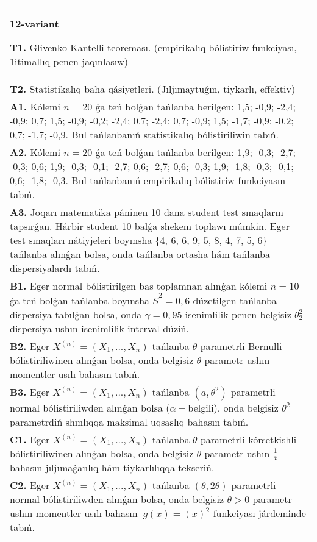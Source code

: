 \documentclass{article}
\begin{document}
\begin{tabular}{m{17cm}}
\textbf{12-variant}
\newline

\textbf{T1.} 
Glivenko-Kantelli teoreması. (empirikalıq bólistiriw funkciyası, 1itimallıq penen jaqınlasıw)
 \\
\textbf{T2.} 
Statistikalıq baha qásiyetleri. (Jıljımaytuǵın, tiykarlı, effektiv)
 \\
\textbf{A1.} 
Kólemi \(n = 20\) ǵa teń bolǵan tańlanba berilgen: 1,5; -0,9; -2,4; -0,9; 0,7; 1,5; -0,9; -0,2; -2,4; 0,7; -2,4; 0,7; -0,9; 1,5; -1,7; -0,9; -0,2; 0,7; -1,7; -0,9. Bul tańlanbanıń statistikalıq bólistiriliwin tabıń.
 \\
\textbf{A2.} 
Kólemi \(n = 20\) ǵa teń bolǵan tańlanba berilgen: 1,9; -0,3; -2,7; -0,3; 0,6; 1,9; -0,3; -0,1; -2,7; 0,6; -2,7; 0,6; -0,3; 1,9; -1,8; -0,3; -0,1; 0,6; -1,8; -0,3. Bul tańlanbanıń empirikalıq bólistiriw funkciyasın tabıń.
 \\
\textbf{A3.} 
Joqarı matematika páninen 10 dana student test sınaqların tapsırǵan. Hárbir student 10 balǵa shekem toplawı múmkin. Eger test sınaqları nátiyjeleri boyınsha \{4, 6, 6, 9, 5, 8, 4, 7, 5, 6\} tańlanba alınǵan bolsa, onda tańlanba ortasha hám tańlanba dispersiyalardı tabıń.
 \\
\textbf{B1.} 
Eger normal bólistirilgen bas toplamnan alınǵan kólemi \(n = 10\) ǵa teń bolǵan tańlanba boyınsha \({\overline{S}}^{2} = 0,6\) dúzetilgen tańlanba dispersiya tabılǵan bolsa, onda \(\gamma = 0,95\) isenimlilik penen belgisiz \(\theta_{2}^{2}\) dispersiya ushın isenimlilik interval dúziń.
 \\
\textbf{B2.} 
Eger \(X^{(n)} = \left( X_{1},...,X_{n} \right)\) tańlanba \(\theta\) parametrli Bernulli bólistiriliwinen alınǵan bolsa, onda belgisiz \(\theta\) parametr ushın momentler usılı bahasın tabıń.
 \\
\textbf{B3.} 
Eger \(X^{(n)} = \left( X_{1},...,X_{n} \right)\) tańlanba \(\left( a,\theta^{2} \right)\) parametrli normal bólistiriliwden alınǵan bolsa (\(\alpha -\)belgili), onda belgisiz \(\theta^{2}\) parametrdiń shınlıqqa maksimal uqsaslıq bahasın tabıń.
 \\
\textbf{C1.} 
Eger \(X^{(n)} = \left( X_{1},...,X_{n} \right)\) tańlanba \(\theta\) parametrli kórsetkishli bólistiriliwinen alınǵan bolsa, onda belgisiz \(\theta\) parametr ushın \(\frac{1}{\overline{x}}\) bahasın jıljımaǵanlıq hám tiykarlılıqqa tekseriń.
 \\
\textbf{C2.} 
Eger \(X^{(n)} = \left( X_{1},...,X_{n} \right)\) tańlanba \((\theta,2\theta)\) parametrli normal bólistiriliwden alınǵan bolsa, onda belgisiz \(\theta > 0\) parametr ushın momentler usılı bahasın \({\ g(x) = (x)}^{2}\) funkciyası járdeminde tabıń.

\end{tabular}
\end{document}
